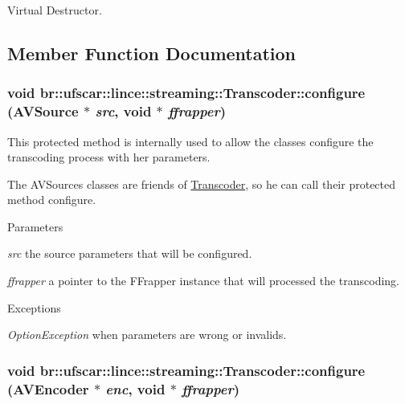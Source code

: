 Virtual Destructor. 



\subsection{Member Function Documentation}
\hypertarget{classbr_1_1ufscar_1_1lince_1_1streaming_1_1Transcoder_a04f5ea04a3111f055853b0975c6744ae}{
\subsubsection[{configure}]{\setlength{\rightskip}{0pt plus 5cm}void br::ufscar::lince::streaming::Transcoder::configure ({\bf AVSource} $\ast$ {\em src}, \/  void $\ast$ {\em ffrapper})}}
\label{classbr_1_1ufscar_1_1lince_1_1streaming_1_1Transcoder_a04f5ea04a3111f055853b0975c6744ae}


This protected method is internally used to allow the classes configure the transcoding process with her parameters. 

The AVSources classes are friends of \hyperlink{classbr_1_1ufscar_1_1lince_1_1streaming_1_1Transcoder}{Transcoder}, so he can call their protected method configure. 
\begin{DoxyParams}{Parameters}
\item[{\em src}]the source parameters that will be configured. \item[{\em ffrapper}]a pointer to the FFrapper instance that will processed the transcoding. \end{DoxyParams}

\begin{DoxyExceptions}{Exceptions}
\item[{\em OptionException}]when parameters are wrong or invalids. \end{DoxyExceptions}
\hypertarget{classbr_1_1ufscar_1_1lince_1_1streaming_1_1Transcoder_ac4c410516ff38a4b2a978077aea67064}{
\subsubsection[{configure}]{\setlength{\rightskip}{0pt plus 5cm}void br::ufscar::lince::streaming::Transcoder::configure ({\bf AVEncoder} $\ast$ {\em enc}, \/  void $\ast$ {\em ffrapper})}}
\label{classbr_1_1ufscar_1_1lince_1_1streaming_1_1Transcoder_ac4c410516ff38a4b2a978077aea67064}


